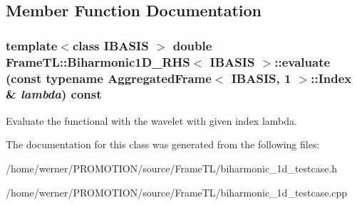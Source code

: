 \subsection{Member Function Documentation}
\hypertarget{classFrameTL_1_1Biharmonic1D__RHS_81cf28300f5a4991eea662f403b5ae88}{
\subsubsection[{evaluate}]{\setlength{\rightskip}{0pt plus 5cm}template$<$class IBASIS $>$ double {\bf FrameTL::Biharmonic1D\_\-RHS}$<$ IBASIS $>$::evaluate (const typename {\bf AggregatedFrame}$<$ IBASIS, 1 $>$::Index \& {\em lambda}) const}}
\label{classFrameTL_1_1Biharmonic1D__RHS_81cf28300f5a4991eea662f403b5ae88}


Evaluate the functional with the wavelet with given index lambda. 

The documentation for this class was generated from the following files:\begin{CompactItemize}
\item 
/home/werner/PROMOTION/source/FrameTL/biharmonic\_\-1d\_\-testcase.h\item 
/home/werner/PROMOTION/source/FrameTL/biharmonic\_\-1d\_\-testcase.cpp\end{CompactItemize}

